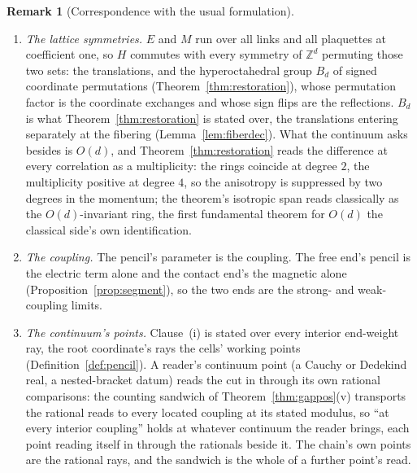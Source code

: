 \documentclass[11pt]{article}
\theoremstyle{definition}
\newtheorem{remark}{Remark}
\begin{document}
\begin{remark}[Correspondence with the usual formulation]
\begin{enumerate}[leftmargin=2em,itemsep=3pt]
\item \emph{The lattice symmetries.} $E$ and $M$ run over all links and all
plaquettes at coefficient one, so $H$ commutes with every symmetry of
$\mathbb Z^d$ permuting those two sets: the translations, and the
hyperoctahedral group $B_d$ of signed coordinate permutations
(Theorem~\ref{thm:restoration}), whose permutation factor is the coordinate
exchanges and whose sign flips are the reflections. $B_d$ is what
Theorem~\ref{thm:restoration} is stated over, the translations entering
separately at the fibering (Lemma~\ref{lem:fiberdec}). What the continuum asks besides is $O(d)$, and
Theorem~\ref{thm:restoration} reads the difference at every correlation as a
multiplicity: the rings coincide at degree $2$, the multiplicity
positive at degree $4$, so the anisotropy is
suppressed by two degrees in the momentum; the theorem's isotropic
span reads classically as the $O(d)$-invariant ring, the first
fundamental theorem for $O(d)$ the classical side's own
identification.

\item \emph{The coupling.} The pencil's parameter is the coupling. The
free end's pencil is the electric term alone and the contact end's
the magnetic alone
(Proposition~\ref{prop:segment}), so the two ends are the strong- and
weak-coupling limits.

\item \emph{The continuum's points.} Clause~(i) is stated over
every interior end-weight ray, the root coordinate's rays the
cells' working points (Definition~\ref{def:pencil}). A reader's
continuum point (a Cauchy
or Dedekind real, a nested-bracket datum) reads the cut in through
its own rational comparisons: the counting sandwich of
Theorem~\ref{thm:gappos}(v) transports the rational reads to every
located coupling at its stated modulus, so ``at every interior
coupling'' holds at whatever continuum the reader brings, each point
reading itself in through the rationals beside it. The chain's own
points are the rational rays, and the sandwich is the whole of a
further point's read.


\end{enumerate}
\end{remark}
\end{document}
